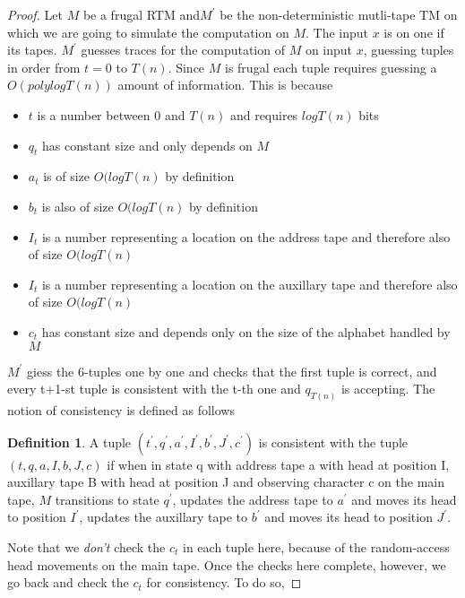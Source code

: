 \documentclass[english]{article}
\theoremstyle{plain}
\theoremstyle{definition}
\newtheorem{defn}[thm]{Definition}
\theoremstyle{plain}
\begin{document}
\begin{proof}
Let $M$ be a frugal RTM and$M^{'}$ be the non-deterministic mutli-tape TM on which we are going to simulate the computation on $M$. The input $x$ is on one if its tapes. $M^{'}$ guesses traces for the computation of $M$ on input $x$, guessing tuples in order from $t = 0$ to $T(n)$. Since $M$ is frugal each tuple requires guessing a $O(polylog T(n))$ amount of information. This is because 

\begin{itemize}
  \item $t$ is a number between $0$ and $T(n)$ and requires $log T(n)$ bits
  \item $q_t$ has constant size and only depends on $M$
  \item $a_t$ is of size $O(log T(n)$ by definition
  \item $b_t$ is also of size $O(log T(n)$ by definition
  \item $I_t$ is a number representing a location on the address tape and therefore also of size $O(log T(n)$
  \item $I_t$ is a number representing a location on the auxillary tape and therefore also of size $O(log T(n)$
  \item $c_t$ has constant size and depends only on the size of the alphabet handled by $M$
\end{itemize}

$M^{'}$ giess the 6-tuples one by one and checks that the first tuple is correct, and every t+1-st tuple is consistent with the t-th one and $q_{T(n)}$ is accepting. The notion of consistency is defined as follows

\begin{defn}
A tuple $(t^{'}, q^{'}, a^{'}, I^{'}, b^{'}, J^{'}, c^{'})$ is consistent with the tuple $(t, q, a, I, b, J, c)$ if when in state q with address tape a with head at position I, auxillary tape B with head at position J and observing character c on the main tape, $M$ transitions to state $q^{'}$, updates the address tape to $a^{'}$ and moves its head to position $I^{'}$, updates the auxillary tape to $b^{'}$ and moves its head to position $J^{'}$.
\end{defn}

Note that we \emph{don't} check the $c_{t}$ in each tuple here, because
of the random-access head movements on the main tape. Once the checks
here complete, however, we go back and check the $c_{t}$ for consistency.
To do so,


\end{proof}
\end{document}
